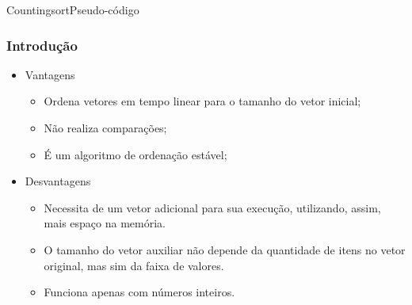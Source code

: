 \documentclass[aspectratio=169]{beamer}
\begin{document}
\begin{frame}{Countingsort}{Pseudo-código}
\end{frame}

\begin{frame}
\frametitle{Introdução}
\begin{itemize}
\item Vantagens
\begin{itemize}
 \item Ordena vetores em tempo linear para o tamanho do vetor inicial;
 \item Não realiza comparações; 
 \item É um algoritmo de ordenação estável;
\end{itemize}
\item Desvantagens
\begin{itemize}
\item Necessita de um vetor adicional para sua execução, utilizando, assim, mais espaço na memória.
\item O tamanho do vetor auxiliar não depende da quantidade de itens no vetor original, mas sim da faixa de valores.
\item Funciona apenas com números inteiros.
\end{itemize}
\end{itemize}
\end{frame}
\end{document}
